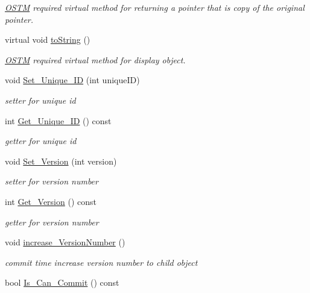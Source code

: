 \begin{DoxyCompactItemize}
\begin{DoxyCompactList}\small\item\em \hyperlink{class_o_s_t_m}{O\+S\+TM} required virtual method for returning a pointer that is copy of the original pointer. \end{DoxyCompactList}\item 
virtual void \hyperlink{class_o_s_t_m_a513396a115f2987fd07c203309ae8a59}{to\+String} ()
\begin{DoxyCompactList}\small\item\em \hyperlink{class_o_s_t_m}{O\+S\+TM} required virtual method for display object. \end{DoxyCompactList}\item 
void \hyperlink{class_o_s_t_m_ab5019a32185631c08abbf826422f2d93}{Set\+\_\+\+Unique\+\_\+\+ID} (int unique\+ID)
\begin{DoxyCompactList}\small\item\em setter for unique id \end{DoxyCompactList}\item 
int \hyperlink{class_o_s_t_m_a5a01a8b98d16b1d1904ecf9356e7b71d}{Get\+\_\+\+Unique\+\_\+\+ID} () const 
\begin{DoxyCompactList}\small\item\em getter for unique id \end{DoxyCompactList}\item 
void \hyperlink{class_o_s_t_m_a9529ad8d6d28c1f0cc9b86ed91df1ae1}{Set\+\_\+\+Version} (int version)
\begin{DoxyCompactList}\small\item\em setter for version number \end{DoxyCompactList}\item 
int \hyperlink{class_o_s_t_m_a1f1db9d482f22c8e7caa17dfb340626b}{Get\+\_\+\+Version} () const 
\begin{DoxyCompactList}\small\item\em getter for version number \end{DoxyCompactList}\item 
void \hyperlink{class_o_s_t_m_a5f90caa4384d371c16b7cac860d9f89a}{increase\+\_\+\+Version\+Number} ()
\begin{DoxyCompactList}\small\item\em commit time increase version number to child object \end{DoxyCompactList}\item 
bool \hyperlink{class_o_s_t_m_a8df39ced3b401aa466df97e26d14b1b7}{Is\+\_\+\+Can\+\_\+\+Commit} () const 

\end{DoxyCompactItemize}
